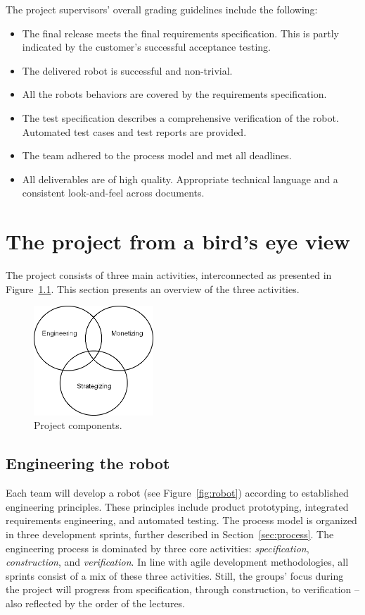 \documentclass{scrreprt}
\begin{document}
The project supervisors' overall grading guidelines include the following:
\begin{itemize}
\item The final release meets the final requirements specification. This is partly indicated by the customer's successful acceptance testing.
\item The delivered robot is successful and non-trivial.
\item All the robots behaviors are covered by the requirements specification.
\item The test specification describes a comprehensive verification of the robot. Automated test cases and test reports are provided.
\item The team adhered to the process model and met all deadlines.
\item All deliverables are of high quality. Appropriate technical language and a consistent look-and-feel across documents.
\end{itemize}

\chapter{The project from a bird's eye view}
The project consists of three main activities, interconnected as presented in Figure~\ref{fig:components}. This section presents an overview of the three activities.

\begin{figure}
\centering
\includegraphics[width=0.40\textwidth]{figures/projectComponents.png}
\caption{Project components.}
\label{fig:components}
\end{figure}

\section{Engineering the robot}
Each team will develop a robot (see Figure~\ref{fig:robot}) according to established engineering principles. These principles include product prototyping, integrated requirements engineering, and automated testing. The process model is organized in three development sprints, further described in Section~\ref{sec:process}. The engineering process is dominated by three core activities: \textit{specification}, \textit{construction}, and \textit{verification}. In line with agile development methodologies, all sprints consist of a mix of these three activities. Still, the groups' focus during the project will progress from specification, through construction, to verification -- also reflected by the order of the lectures.
\end{document}
